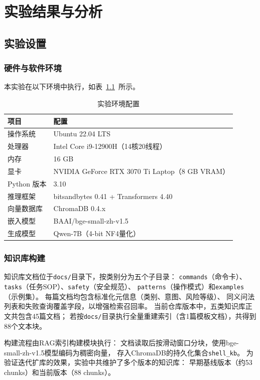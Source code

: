 \chapter{实验结果与分析}

\section{实验设置}

\subsection{硬件与软件环境}

本实验在以下环境中执行，如表~\ref{tab:env}~所示。

\begin{table}[htbp]
\centering
\caption{实验环境配置}
\label{tab:env}
\begin{tabular}{ll}
\toprule
项目 & 配置 \\
\midrule
操作系统 & Ubuntu 22.04 LTS \\
处理器 & Intel Core i9-12900H（14核20线程） \\
内存 & 16 GB \\
显卡 & NVIDIA GeForce RTX 3070 Ti Laptop（8 GB VRAM） \\
Python 版本 & 3.10 \\
推理框架 & bitsandbytes 0.41 + Transformers 4.40 \\
向量数据库 & ChromaDB 0.4.x \\
嵌入模型 & BAAI/bge-small-zh-v1.5 \\
生成模型 & Qwen-7B（4-bit NF4量化） \\
\bottomrule
\end{tabular}
\end{table}

\subsection{知识库构建}

知识库文档位于\texttt{docs/}目录下，按类别分为五个子目录：
\texttt{commands}（命令卡）、\texttt{tasks}（任务SOP）、\texttt{safety}（安全规范）、
\texttt{patterns}（操作模式）和\texttt{examples}（示例集）。
每篇文档均包含标准化元信息（类别、意图、风险等级）、
同义问法列表和失败查询覆盖字段，以增强检索召回率。
当前仓库版本中，五类知识库正文共包含45篇文档；
若按\texttt{docs/}目录执行全量重建索引（含1篇模板文档），共得到88个文本块。

构建流程由RAG索引构建模块执行：
文档读取后按滑动窗口分块，使用bge-small-zh-v1.5模型编码为稠密向量，
存入ChromaDB的持久化集合\texttt{shell\_kb}。
为验证迭代扩库的效果，实验中共维护了多个版本的知识库：
早期基线版本（约53 chunks）和当前版本（88 chunks）。

